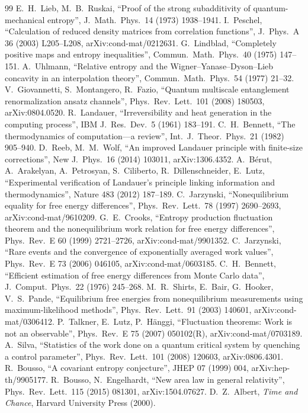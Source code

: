 \documentclass[11pt]{article}
\theoremstyle{remark}\newtheorem*{remark}{Remark}
\begin{document}
\begin{thebibliography}{99}
 E.~H.~Lieb, M.~B.~Ruskai, ``Proof of the strong subadditivity of quantum-mechanical entropy'', J.\ Math.\ Phys.\ 14 (1973) 1938--1941.
 I.~Peschel, ``Calculation of reduced density matrices from correlation functions'', J.\ Phys.\ A 36 (2003) L205--L208, arXiv:cond-mat/0212631.
 G.~Lindblad, ``Completely positive maps and entropy inequalities'', Commun.\ Math.\ Phys.\ 40 (1975) 147--151.
 A.~Uhlmann, ``Relative entropy and the Wigner--Yanase--Dyson--Lieb concavity in an interpolation theory'', Commun.\ Math.\ Phys.\ 54 (1977) 21--32.
 V.~Giovannetti, S.~Montangero, R.~Fazio, ``Quantum multiscale entanglement renormalization ansatz channels'', Phys.\ Rev.\ Lett.\ 101 (2008) 180503, arXiv:0804.0520.
 R.~Landauer, ``Irreversibility and heat generation in the computing process'', IBM J.\ Res.\ Dev.\ 5 (1961) 183--191.
 C.~H.~Bennett, ``The thermodynamics of computation---a review'', Int.\ J.\ Theor.\ Phys.\ 21 (1982) 905--940.
 D.~Reeb, M.~M.~Wolf, ``An improved Landauer principle with finite-size corrections'', New J.\ Phys.\ 16 (2014) 103011, arXiv:1306.4352.
 A.~B\'erut, A.~Arakelyan, A.~Petrosyan, S.~Ciliberto, R.~Dillenschneider, E.~Lutz, ``Experimental verification of Landauer's principle linking information and thermodynamics'', Nature 483 (2012) 187--189.
 C.~Jarzynski, ``Nonequilibrium equality for free energy differences'', Phys.\ Rev.\ Lett.\ 78 (1997) 2690--2693, arXiv:cond-mat/9610209.
 G.~E.~Crooks, ``Entropy production fluctuation theorem and the nonequilibrium work relation for free energy differences'', Phys.\ Rev.\ E 60 (1999) 2721--2726, arXiv:cond-mat/9901352.
 C.~Jarzynski, ``Rare events and the convergence of exponentially averaged work values'', Phys.\ Rev.\ E 73 (2006) 046105, arXiv:cond-mat/0603185.
 C.~H.~Bennett, ``Efficient estimation of free energy differences from Monte Carlo data'', J.\ Comput.\ Phys.\ 22 (1976) 245--268.
 M.~R.~Shirts, E.~Bair, G.~Hooker, V.~S.~Pande, ``Equilibrium free energies from nonequilibrium measurements using maximum-likelihood methods'', Phys.\ Rev.\ Lett.\ 91 (2003) 140601, arXiv:cond-mat/0306412.
 P.~Talkner, E.~Lutz, P.~H\"anggi, ``Fluctuation theorems: Work is not an observable'', Phys.\ Rev.\ E 75 (2007) 050102(R), arXiv:cond-mat/0703189.
 A.~Silva, ``Statistics of the work done on a quantum critical system by quenching a control parameter'', Phys.\ Rev.\ Lett.\ 101 (2008) 120603, arXiv:0806.4301.
 R.~Bousso, ``A covariant entropy conjecture'', JHEP 07 (1999) 004, arXiv:hep-th/9905177.
 R.~Bousso, N.~Engelhardt, ``New area law in general relativity'', Phys.\ Rev.\ Lett.\ 115 (2015) 081301, arXiv:1504.07627.
 D.~Z.~Albert, \emph{Time and Chance}, Harvard University Press (2000).
\end{thebibliography}
\endgroup
\end{document}
